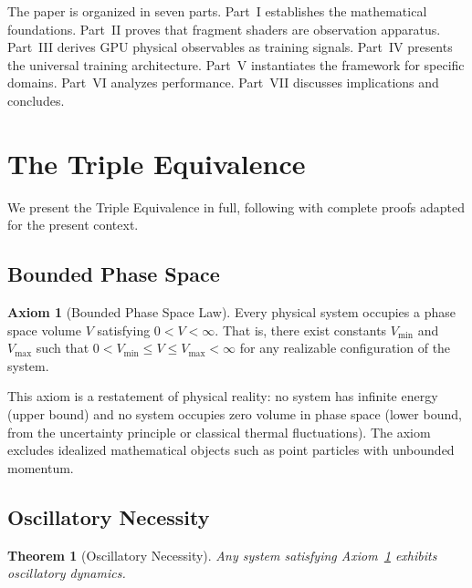 \documentclass[11pt,twocolumn,a4paper]{article}
\newtheorem{theorem}{Theorem}[section]
\theoremstyle{definition}
\newtheorem{axiom}{Axiom}
\theoremstyle{remark}
\begin{document}
The paper is organized in seven parts. Part~I establishes the mathematical foundations. Part~II proves that fragment shaders are observation apparatus. Part~III derives GPU physical observables as training signals. Part~IV presents the universal training architecture. Part~V instantiates the framework for specific domains. Part~VI analyzes performance. Part~VII discusses implications and concludes.


\section{The Triple Equivalence}
\label{sec:triple_equivalence}

We present the Triple Equivalence in full, following \citet{sachikonye2025a} with complete proofs adapted for the present context.

\subsection{Bounded Phase Space}

\begin{axiom}[Bounded Phase Space Law]
\label{ax:bounded}
Every physical system occupies a phase space volume $V$ satisfying $0 < V < \infty$. That is, there exist constants $V_{\min}$ and $V_{\max}$ such that $0 < V_{\min} \leq V \leq V_{\max} < \infty$ for any realizable configuration of the system.
\end{axiom}

This axiom is a restatement of physical reality: no system has infinite energy (upper bound) and no system occupies zero volume in phase space (lower bound, from the uncertainty principle or classical thermal fluctuations). The axiom excludes idealized mathematical objects such as point particles with unbounded momentum.

\subsection{Oscillatory Necessity}

\begin{theorem}[Oscillatory Necessity]
\label{thm:osc_necessity}
Any system satisfying Axiom~\ref{ax:bounded} exhibits oscillatory dynamics.
\end{theorem}
\end{document}
